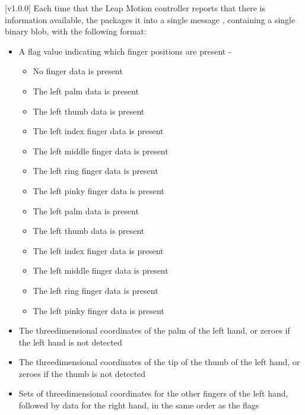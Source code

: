 [v1.0.0]
Each time that the Leap Motion controller reports that there is information available,
the  packages it into a single message
\openSq{}\closeSq, containing a single binary blob, with the following
format:
\begin{itemize}
\item A flag value indicating which finger positions are present -
\begin{itemize}
\item {} No finger data is present
\item\exSp{} The left palm data is present
\item\exSp{} The left thumb data is present
\item\exSp{} The left index finger data is present
\item\exSp{} The left middle finger data is present
\item\exSp{} The left ring finger data is present
\item\exSp{} The left pinky finger data is present
\item\exSp{} The left palm data is present
\item\exSp{} The left thumb data is present
\item\exSp{} The left index finger data is present
\item\exSp{} The left middle finger data is present
\item\exSp{} The left ring finger data is present
\item\exSp{} The left pinky finger data is present
\end{itemize}
\item\exSp{}The three\longDash{}dimensional coordinates of the palm of the left hand, or
zeroes if the left hand is not detected
\item\exSp{}The three\longDash{}dimensional coordinates of the tip of the thumb of the
left hand, or zeroes if the thumb is not detected
\item\exSp{}Sets of three\longDash{}dimensional coordinates for the other fingers of the
left hand, followed by data for the right hand, in the same order as the flags
\end{itemize}
\appendixEnd{}
